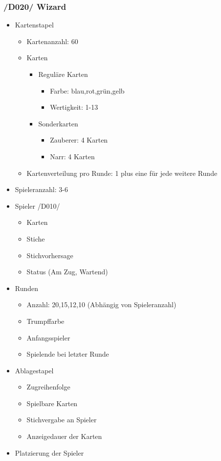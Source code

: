 \documentclass{article}
\begin{document}
\subsubsection{/D020/ Wizard}
\begin{itemize}
	\item Kartenstapel
	\begin{itemize}
		\item Kartenanzahl: 60
		\item Karten
		\begin{itemize}
			\item Reguläre Karten
			\begin{itemize}
				\item Farbe: blau,rot,grün,gelb
				\item Wertigkeit: 1-13	
			\end{itemize}
			\item Sonderkarten
			\begin{itemize}
				\item Zauberer: 4 Karten
				\item Narr: 4 Karten
			\end{itemize}			
		\end{itemize}	
		\item Kartenverteilung pro Runde: 1 plus eine für jede weitere Runde
	\end{itemize}
	\item Spieleranzahl: 3-6
	\item Spieler /D010/
	\begin{itemize}
		\item Karten
		\item Stiche
		\item Stichvorhersage
		\item Status (Am Zug, Wartend)
	\end{itemize}
	\item Runden
	\begin{itemize}
		\item Anzahl: 20,15,12,10 (Abhängig von Spieleranzahl)
		\item Trumpffarbe
		\item Anfangsspieler
		\item Spielende bei letzter Runde
	\end{itemize}
	\item Ablagestapel
	\begin{itemize}
		\item Zugreihenfolge
		\item Spielbare Karten
		\item Stichvergabe an Spieler
		\item Anzeigedauer der Karten
	\end{itemize}
	\item Platzierung der Spieler
\end{itemize}
\end{document}
